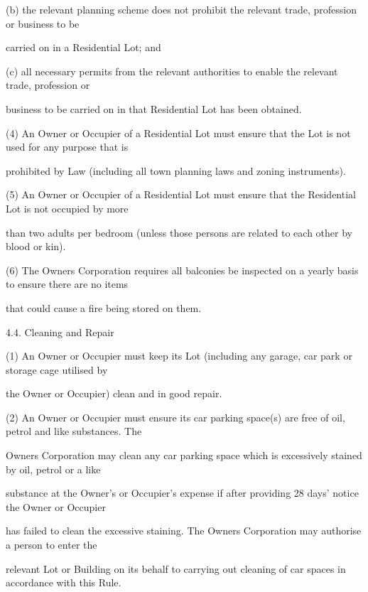 \documentclass{article}
\begin{document}
{\fontsize{9.962}{1}(b) the relevant planning scheme does not prohibit the relevant trade, profession or business to be }

{\fontsize{10.02}{1}carried on in a Residential Lot; and }

{\fontsize{9.962}{1}(c) all necessary permits from the relevant authorities to enable the relevant trade, profession or }

{\fontsize{10.02}{1}business to be carried on in that Residential Lot has been obtained. }

{\fontsize{9.962}{1}(4) An Owner or Occupier of a Residential Lot must ensure that the Lot is not used for any purpose that is }

{\fontsize{10.02}{1}prohibited by Law (including all town planning laws and zoning instruments). }

{\fontsize{9.962}{1}(5) An Owner or Occupier of a Residential Lot must ensure that the Residential Lot is not occupied by more }

{\fontsize{10.02}{1}than two adults per bedroom (unless those persons are related to each other by blood or kin). }

{\fontsize{9.962}{1}(6) The Owners Corporation requires all balconies be inspected on a yearly basis to ensure there are no items }

{\fontsize{10.02}{1}that could cause a fire being stored on them. }

{\fontsize{9.99}{1}4.4. Cleaning and Repair }

{\fontsize{9.962}{1}(1) An Owner or Occupier must keep its Lot (including any garage, car park or storage cage utilised by }

{\fontsize{10.02}{1}the Owner or Occupier) clean and in good repair. }

{\fontsize{9.962}{1}(2) An Owner or Occupier must ensure its car parking space(s) are free of oil, petrol and like substances. The }

{\fontsize{10.02}{1}Owners Corporation may clean any car parking space which is excessively stained by oil, petrol or a like }

{\fontsize{10.02}{1}substance at the Owner's or Occupier's expense if after providing 28 days’ notice the Owner or Occupier }

{\fontsize{10.02}{1}has failed to clean the excessive staining. The Owners Corporation may authorise a person to enter the }

{\fontsize{10.02}{1}relevant Lot or Building on its behalf to carrying out cleaning of car spaces in accordance with this Rule. }
\end{document}
